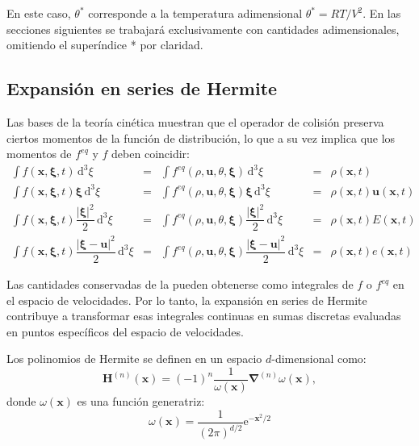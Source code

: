 En este caso, $\theta^*$ corresponde a la temperatura adimensional $\theta^*=RT/V^2$. En las secciones siguientes se trabajar\'a exclusivamente con cantidades adimensionales, omitiendo el super\'indice * por claridad.


\subsection{Expansi\'on en series de Hermite}
Las bases de la teor\'ia cin\'etica muestran que el operador de colisi\'on preserva ciertos momentos de la funci\'on de distribuci\'on, lo que a su vez implica que los momentos de $f^{eq}$ y $f$ deben coincidir:
\begin{subequations}
	\begin{align}
		\int f(\bm{x},\bm{\xi},t) \, \mbox{d}^3 \xi &=& \int f^{eq}(\rho, \bm{u},\theta,\bm{\xi}) \, \mbox{d}^3 \xi &=& \rho(\bm{x},t)\\
		\int f(\bm{x},\bm{\xi},t) \bm{\xi}\, \mbox{d}^3 \xi &=& \int f^{eq}(\rho, \bm{u},\theta,\bm{\xi}) \bm{\xi}\, \mbox{d}^3 \xi &=& \rho(\bm{x},t)\bm{u}(\bm{x},t)\\
		\int f(\bm{x},\bm{\xi},t) \dfrac{|\bm{\xi}|^2}{2} \, \mbox{d}^3 \xi &=& \int f^{eq}(\rho, \bm{u},\theta,\bm{\xi}) \dfrac{|\bm{\xi}|^2}{2} \, \mbox{d}^3 \xi &=& \rho(\bm{x},t)E(\bm{x},t)\\		
		\int f(\bm{x},\bm{\xi},t) \dfrac{|\bm{\xi}-\bm{u}|^2}{2} \, \mbox{d}^3 \xi &=& \int f^{eq}(\rho, \bm{u},\theta,\bm{\xi}) \dfrac{|\bm{\xi}-\bm{u}|^2}{2} \, \mbox{d}^3 \xi &=& \rho(\bm{x},t)e(\bm{x},t)		
	\end{align}
	\label{eq:cons_moments}	
\end{subequations}

Las cantidades conservadas de la  pueden obtenerse como integrales de $f$ o $f^{eq}$ en el espacio de velocidades. Por lo tanto, la expansi\'on en series de Hermite contribuye a transformar esas integrales continuas en sumas discretas evaluadas en puntos espec\'ificos del espacio de velocidades.
\par
Los polinomios de Hermite se definen en un espacio $d$-dimensional como: \cite{shan_kinetic_2006,grad_kinetic_1949}
\begin{equation}
	\bm{H}^{(n)} (\bm{x})= (-1)^n\dfrac{1}{\omega (\bm{x})} \bm{\nabla}^{(n)}\omega(\bm{x}),
\end{equation}
donde $\omega(\bm{x})$ es una funci\'on generatriz:
\begin{equation}
	\omega(\bm{x}) = \dfrac{1}{(2\pi)^{d/2}}\mbox{e}^{-\bm{x}^2/2}
\end{equation}

